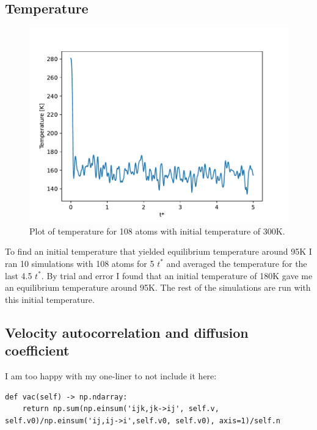 \documentclass[a4paper,10pt,english]{article}
\begin{document}
\subsection{Temperature} \label{4a}

\begin{figure}[h!]
    \centering
    \includegraphics[scale=0.65]{../figures/4_a_ii.pdf}
    \caption{Plot of temperature for 108 atoms with initial temperature of 300K.}
    \label{fig:temperature1}
\end{figure}

To find an initial temperature that yielded equilibrium temperature around 95K I ran 10 simulations with 108 atoms for 5 $t^*$ and averaged the temperature for the last 4.5 $t^*$. By trial and error I found that an initial temperature of 180K gave me an equilibrium temperature around 95K. The rest of the simulations are run with this initial temperature.

\subsection{Velocity autocorrelation and diffusion coefficient} \label{4b}

I am too happy with my one-liner to not include it here:
\begin{lstlisting}[breaklines=true]
def vac(self) -> np.ndarray:
    return np.sum(np.einsum('ijk,jk->ij', self.v, self.v0)/np.einsum('ij,ij->i',self.v0, self.v0), axis=1)/self.n
\end{lstlisting}
\end{document}
